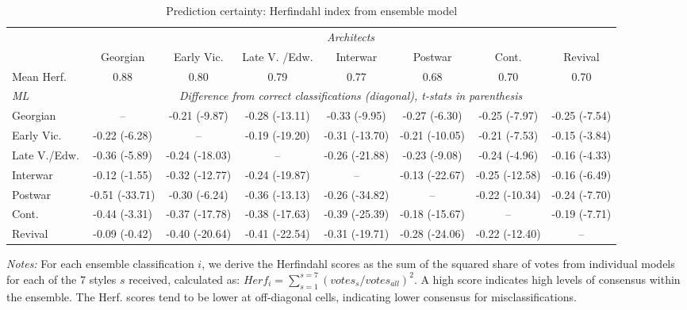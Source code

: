 \documentclass[]{article}
\begin{document}
\clearpage

\begin{table}[!htb] 
\caption{Prediction certainty: Herfindahl index from ensemble model} 
\label{tab:herftab} 
\footnotesize
\begin{tabular}{lccccccc}
\toprule 
  & \multicolumn{7}{c}{\emph{Architects}} \\ 
  \cmidrule(lr){2-8} 
& Georgian &  Early Vic. & Late V. /Edw. & Interwar & Postwar & Cont. & Revival \\  

Mean Herf. & 0.88 &  0.80 & 0.79 & 0.77 & 0.68 &  0.70 &  0.70 \\  
 \midrule 
\emph{ML} & \multicolumn{7}{c}{\emph{Difference from correct classifications (diagonal), t-stats in parenthesis}} \\
\cmidrule(lr){2-8} 
Georgian & -- & -0.21 (-9.87) & -0.28 (-13.11) & -0.33 (-9.95) & -0.27 (-6.30) & -0.25 (-7.97) & -0.25 (-7.54) \\
 Early Vic. & -0.22 (-6.28) &  -- & -0.19 (-19.20) & -0.31 (-13.70) & -0.21 (-10.05) & -0.21 (-7.53) & -0.15 (-3.84) \\
 Late V./Edw. & -0.36 (-5.89) & -0.24 (-18.03) &  -- & -0.26 (-21.88) & -0.23 (-9.08) & -0.24 (-4.96) & -0.16 (-4.33) \\
 Interwar & -0.12 (-1.55) & -0.32 (-12.77) & -0.24 (-19.87) &  -- & -0.13 (-22.67) & -0.25 (-12.58) & -0.16 (-6.49) \\
 Postwar & -0.51 (-33.71) & -0.30 (-6.24) & -0.36 (-13.13) & -0.26 (-34.82) & -- & -0.22 (-10.34) & -0.24 (-7.70) \\
 Cont. & -0.44 (-3.31) & -0.37 (-17.78) & -0.38 (-17.63) & -0.39 (-25.39) & -0.18 (-15.67) & -- & -0.19 (-7.71) \\
 Revival & -0.09 (-0.42) & -0.40 (-20.64) & -0.41 (-22.54) & -0.31 (-19.71) & -0.28 (-24.06) & -0.22 (-12.40) &  -- \\
\bottomrule 
\end{tabular}
\begin{minipage}{\textwidth}
\vspace{0.25cm}
\footnotesize \emph{Notes:} For each ensemble classification $i$, we derive the Herfindahl scores as the sum of the squared share of votes from individual models for each of the 7 styles $s$ received, calculated as: $Herf_i=\sum_{s=1}^{s=7} (votes_s/votes_{all})^2$. A high score indicates high levels of consensus within the ensemble. The Herf. scores tend to be lower at off-diagonal cells, indicating lower consensus for misclassifications.
\end{minipage}
\end{table}
\end{document}
